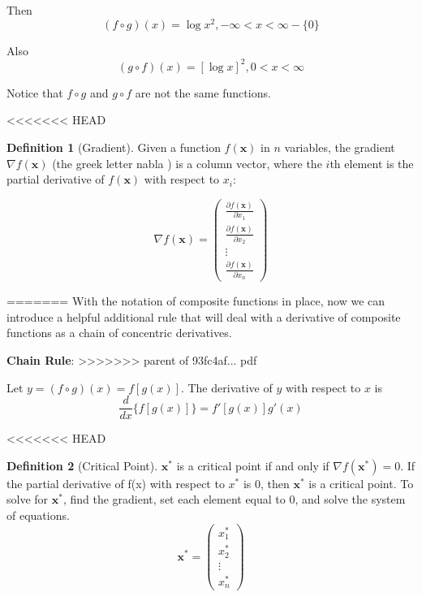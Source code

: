 \documentclass[]{book}
\theoremstyle{definition}
\newtheorem{definition}{Definition}[chapter]
\theoremstyle{definition}
\theoremstyle{definition}
\theoremstyle{remark}
\begin{document}
Then
\[(f\circ g)(x)=\log x^2, -\infty<x<\infty - \{0\}\]

Also
\[(g\circ f)(x)=[\log x]^2, 0<x<\infty\]

Notice that \(f\circ g\) and \(g\circ f\) are not the same functions.

<<<<<<< HEAD
\begin{definition}[Gradient]
\protect\hypertarget{def:unnamed-chunk-52}{}{\label{def:unnamed-chunk-52} {} }
Given a function \(f(\textbf{x})\) in \(n\) variables, the gradient \(\nabla f(\mathbf{x})\) (the greek letter nabla ) is a column vector, where the \(i\)th element is the partial derivative of \(f(\textbf{x})\) with respect to \(x_i\):

\[\nabla f(\mathbf{x}) = \begin{pmatrix}
\frac{\partial f(\mathbf{x})}{\partial x_1}\\ \frac{\partial f(\mathbf{x})}{\partial x_2}\\
  \vdots \\ \frac{\partial f(\mathbf{x})}{\partial x_n} \end{pmatrix}\]
\end{definition}
=======
With the notation of composite functions in place, now we can introduce a helpful additional rule that will deal with a derivative of composite functions as a chain of concentric derivatives.

\textbf{Chain Rule}:
>>>>>>> parent of 93fc4af... pdf

Let \(y=(f\circ g)(x)= f[g(x)]\). The derivative of \(y\) with respect to \(x\) is \[\frac{d}{dx} \{ f[g(x)] \} = f'[g(x)] g'(x)\]

<<<<<<< HEAD
\begin{definition}[Critical Point]
\protect\hypertarget{def:unnamed-chunk-53}{}{\label{def:unnamed-chunk-53} {} }
\(\mathbf{x}^*\) is a critical point if and only if \(\nabla f(\mathbf{x}^*)=0\). If the partial derivative of f(x) with respect to \(x^*\) is 0, then \(\mathbf{x}^*\) is a critical point. To solve for \(\mathbf{x}^*\), find the gradient, set each element equal to 0, and solve the system of equations. \[\mathbf{x}^* = \begin{pmatrix} x_1^*\\x_2^*\\ \vdots \\ x_n^*\end{pmatrix}\]
\end{definition}
\end{document}
